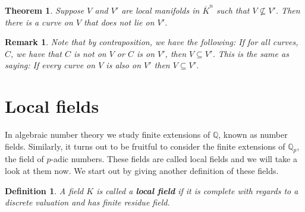 \documentclass{article}
\newtheorem{theorem}{Theorem}[section]
\newtheorem{definition}{Definition}[section]
\newtheorem{remark}{Remark}[section]
\newcommand{\mbb}[1]{\mathbb{#1}}
\begin{document}
\begin{theorem}\label{thm: One manifold is contained in another}
    Suppose $V$ and $V'$ are local manifolds in $\overline K^n$ such that $V \nsubseteq V'$. Then there is a curve on $V$ that does not lie on $V'$.
\end{theorem}
\begin{remark}\label{remark: One manifold is contained in another}
    Note that by contraposition, we have the following: If for all curves, $C$, we have that $C$ is not on $V$ or $C$ is on $V'$, then $V \subseteq V'$. This is the same as saying: If every curve on $V$ is also on $V'$ then $V \subseteq V'$.
\end{remark}


\section{Local fields}
In algebraic number theory we study finite extensions of $\mbb Q$, known as number fields. Similarly, it turns out to be fruitful to consider the finite extensions of $\mbb Q_p$, the field of $p$-adic numbers. These fields are called local fields and we will take a look at them now. We start out by giving another definition of these fields.

\begin{definition}
    A field $K$ is called a \textbf{local field} if it is complete with regards to a discrete valuation and has finite residue field.
\end{definition}
\end{document}
